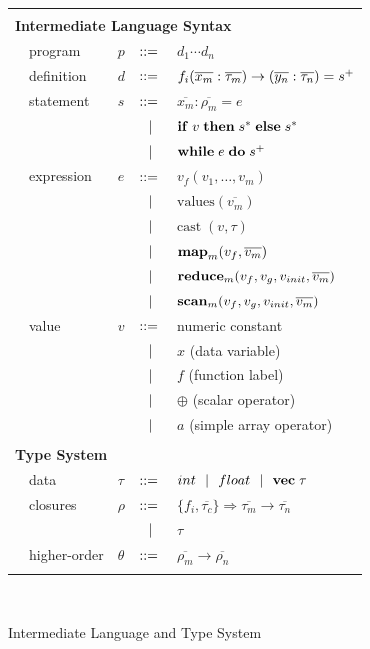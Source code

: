 \documentclass[preprint]{sigplanconf}
\begin{document}
\begin{figure}
  \begin{tabular}{| m{0.01cm}m{1.5cm}m{0.1cm}m{0.2cm}p{4.5cm} |}
  \hline
  & & & &\\
   \multicolumn{5}{|l|}{\textbf{Intermediate Language Syntax}}  \\[4pt]
  & program & $p$ &  $::=$   &  $d_1 \cdots d_n $ \\[4pt]
  & definition & $d$ & $::=$ & $f_i(\overline{x_m} : \overline{\tau_m}) \rightarrow (\overline{y_n} : \overline{\tau_n}) =s^{\small{+}}$ \\[4pt]
  & statement  & $s$ & $::=$ & $\overline{x_m} : \overline{\rho_m} = e $\\[2pt]
  &            &     & $\ \ | \ \ $    & $\mbox{\textbf{if}} \;v\; \mbox{\textbf{then}} \;s^*\; \mbox{\textbf{else}} \;s^*$ \\[2pt]
  &            &     & $\ \ | \ \ $    & $\mbox{\textbf{while}} \;e\; \mbox{\textbf{do}} \;s^+\;  $ \\[4pt]
  & expression & $e$ & $::=$ & $ v_{f}(v_1, \ldots, v_m)$ \\[2pt]
  &            &     & $\ \ | \ \ $    & $\textrm{values} (\overline{v_m})$ \\[2pt]
  &            &     & $\ \ | \ \ $    & $\textrm{cast} \; (v, \tau)$ \\[2pt] 
  &            &     & $\ \ | \ \ $    & $\mbox{\textbf{map}}_m (v_{f},\overline{v_m})$ \\[2pt]
  &            &     & $\ \ | \ \ $    & $\mbox{\textbf{reduce}}_m (v_{f}, v_{g}, v_{init}, \overline{v_m})$ \\[2pt]
  &            &     & $\ \ | \ \ $    & $\mbox{\textbf{scan}}_m (v_{f}, v_{g}, v_{init}, \overline{v_m})$ \\[4pt]
  & value      & $v$ & $::=$ & numeric constant\\[2pt]
  &            &     & $\ \ | \ \ $    &  $x$  \quad \small{(data variable)} \\[2pt]
  &            &     & $\ \ | \ \ $    &  $f$  \quad \small{(function label)} \\[2pt]
  &            &     & $\ \ | \ \ $    &  $\oplus$ \quad \small{(scalar operator)} \\[2pt]
  &            &     & $\ \ | \ \ $    &  $a$ \quad \small{(simple array operator)}
\\[4pt]
  & & & &\\
  \multicolumn{5}{|l|}{\textbf{Type System}} \\[4pt]
  & data     & $\tau$    & $::=$ & $int \ \ | \ \  float \ \ | \ \  \mathbf{vec} \; \tau   $ \\[4pt]
  & closures        & $\rho$  & $::=$ & $\{f_i, \overline{\tau_{c}} \} \Rightarrow \overline{\tau_m} \rightarrow \overline{\tau_n}$\\[2pt]
  &                 &           & $\ \ | \ \ $    & $\tau$ \\[4pt]
  & higher-order    & $\theta$  & $::=$ & $\overline{\rho_m} \rightarrow
\overline{\rho_n} $ \\[4pt]
  & & & &\\
  \hline
  \end{tabular}\\[4pt]
\caption{Intermediate Language and Type System}
\label{ILandType}
\end{figure}
\end{document}
